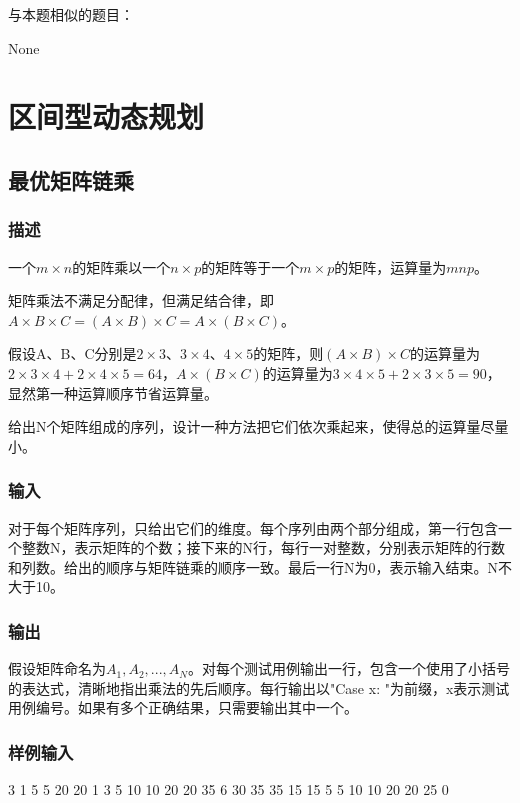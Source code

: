 与本题相似的题目：
\begindot
\item  None
\myenddot


\section{区间型动态规划} %


\subsection{最优矩阵链乘}
\subsubsection{描述}
一个$m \times n$的矩阵乘以一个$n \times p$的矩阵等于一个$m \times p$的矩阵，运算量为$mnp$。

矩阵乘法不满足分配律，但满足结合律，即$A \times B \times C=(A \times B) \times C=A \times (B \times C)$。

假设A、B、C分别是$2 \times 3$、$3 \times 4$、$4 \times 5$的矩阵，则$(A \times B) \times C$的运算量为$2 \times 3 \times 4 + 2 \times 4 \times 5=64$，$A \times (B \times C)$的运算量为$3 \times 4 \times 5 + 2 \times 3 \times 5=90$，显然第一种运算顺序节省运算量。

给出N个矩阵组成的序列，设计一种方法把它们依次乘起来，使得总的运算量尽量小。

\subsubsection{输入}
对于每个矩阵序列，只给出它们的维度。每个序列由两个部分组成，第一行包含一个整数N，表示矩阵的个数；接下来的N行，每行一对整数，分别表示矩阵的行数和列数。给出的顺序与矩阵链乘的顺序一致。最后一行N为0，表示输入结束。N不大于10。

\subsubsection{输出}
假设矩阵命名为$A_1,A_2,...,A_N$。对每个测试用例输出一行，包含一个使用了小括号的表达式，清晰地指出乘法的先后顺序。每行输出以"Case x: "为前缀，x表示测试用例编号。如果有多个正确结果，只需要输出其中一个。

\subsubsection{样例输入}
\begin{Code}
3
1 5
5 20
20 1
3
5 10
10 20
20 35
6
30 35
35 15
15 5
5 10
10 20
20 25
0
\end{Code}

